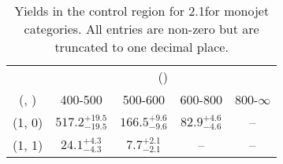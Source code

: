 \begin{table}[h!]
\tiny
\centering
\caption{Yields in the \gj control region for 2.1\ifb for monojet categories. All entries are non-zero but are truncated to one decimal place.\label{tab:yieldssep_gj_ewk_mono}}
\begin{tabular}
{ccccc}
	\hline\hline
	& \multicolumn{4}{c}{\scalht (\gev)} \\ 
	 (\njet,  \nb) & 400-500 & 500-600 & 600-800 & 800-$\infty$ \\ [0.8ex] 
\hline
	(1, 0) & $517.2^{+ 19.5 }_{- 19.5 }$ & $166.5^{+ 9.6 }_{- 9.6 }$ & $82.9^{+ 4.6 }_{- 4.6 }$ & -- \\[0.5ex] 
	(1, 1) & $24.1^{+ 4.3 }_{- 4.3 }$ & $7.7^{+ 2.1 }_{- 2.1 }$ & -- & -- \\[0.5ex] 
	\hline
	\hline
\end{tabular}
\end{table}
